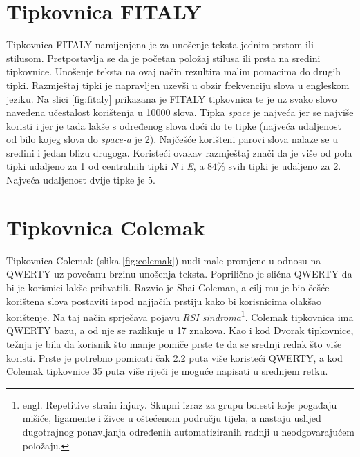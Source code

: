 \documentclass[times, utf8, zavrsni, numeric]{fer}
\begin{document}
\section{Tipkovnica FITALY}
Tipkovnica FITALY namijenjena je za unošenje teksta jednim prstom ili stilusom. Pretpostavlja se da je početan položaj stilusa ili prsta na sredini tipkovnice. Unošenje teksta na ovaj način rezultira malim pomacima do drugih tipki. Razmještaj tipki je napravljen uzevši u obzir frekvenciju slova u engleskom jeziku. Na slici \ref{fig:fitaly} prikazana je FITALY tipkovnica te je uz svako slovo navedena učestalost korištenja u 10000 slova. Tipka \emph{space} je najveća jer se najviše koristi i jer je tada lakše s određenog slova doći do te tipke (najveća udaljenost od bilo kojeg slova do \emph{space-a} je 2). Najčešće korišteni parovi slova nalaze se u sredini i jedan blizu drugoga. Koristeći ovakav razmještaj znači da je više od pola tipki udaljeno za 1 od centralnih tipki \emph{N} i \emph{E}, a $84\%$ svih tipki je udaljeno za 2. Najveća udaljenost dvije tipke je 5.

\section{Tipkovnica Colemak}
Tipkovnica Colemak (slika \ref{fig:colemak}) nudi male promjene u odnosu na QWERTY uz povećanu brzinu unošenja teksta. Poprilično je slična QWERTY da bi je korisnici lakše prihvatili. Razvio je Shai Coleman, a cilj mu je bio češće korištena slova postaviti ispod najjačih prstiju kako bi korisnicima olakšao korištenje. Na taj način sprječava pojavu \emph{RSI sindroma}\footnote{engl. Repetitive strain injury. Skupni izraz za grupu bolesti koje pogađaju mišiće, ligamente i živce u oštećenom području tijela, a nastaju uslijed dugotrajnog ponavljanja određenih automatiziranih radnji u neodgovarajućem položaju.}. Colemak tipkovnica ima QWERTY bazu, a od nje se razlikuje u 17 znakova. Kao i kod Dvorak tipkovnice, težnja je bila da korisnik što manje pomiče prste te da se srednji redak što više koristi. Prste je potrebno pomicati čak 2.2 puta više koristeći QWERTY, a kod Colemak tipkovnice 35 puta više riječi je moguće napisati u srednjem retku.
\end{document}
